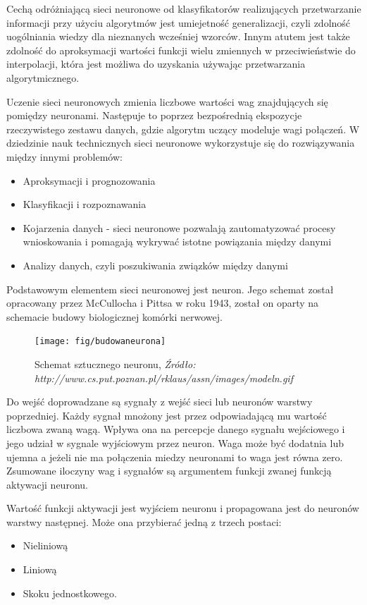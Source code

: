 \documentclass[brudnopis]{xmgr}
\begin{document}
Cechą odróżniającą sieci neuronowe od klasyfikatorów realizujących przetwarzanie informacji przy użyciu algorytmów jest umiejetność generalizacji, czyli zdolność uogólniania wiedzy dla nieznanych wcześniej wzorców. Innym atutem jest także zdolność do aproksymacji wartości funkcji wielu zmiennych w przeciwieństwie do interpolacji, która jest możliwa do uzyskania używając przetwarzania algorytmicznego.

Uczenie sieci neuronowych zmienia liczbowe wartości wag znajdujących się pomiędzy neuronami. Następuje to poprzez bezpośrednią ekspozycje rzeczywistego zestawu danych, gdzie algorytm uczący modeluje wagi połączeń. W dziedzinie nauk technicznych sieci neuronowe wykorzystuje się do rozwiązywania między innymi problemów:

\begin{itemize}
\item
Aproksymacji i prognozowania
\item
Klasyfikacji i rozpoznawania
\item
Kojarzenia danych - sieci neuronowe pozwalają zautomatyzować procesy wnioskowania i pomagają wykrywać istotne powiązania między danymi
\item
Analizy danych, czyli poszukiwania związków między danymi
\end{itemize}

Podstawowym elementem sieci neuronowej jest neuron. Jego schemat został opracowany przez McCullocha i Pittsa w roku 1943, został on oparty na schemacie budowy biologicznej komórki nerwowej.

\begin{figure}[!tbh]
\centering
\texttt{[image: fig/budowaneurona]}
\caption{Schemat sztucznego neuronu, \emph{Źródło: http://www.cs.put.poznan.pl/rklaus/assn/images/modeln.gif}}
\end{figure}

Do wejść doprowadzane są sygnały z wejść sieci lub neuronów warstwy poprzedniej. Każdy sygnał mnożony jest przez odpowiadającą mu wartość liczbowa zwaną wagą. Wpływa ona na percepcje danego sygnału wejściowego i jego udział w sygnale wyjściowym przez neuron. Waga może być dodatnia lub ujemna a jeżeli nie ma połączenia miedzy neuronami to waga jest równa zero. Zsumowane iloczyny wag i sygnałów są argumentem funkcji zwanej funkcją aktywacji neuronu.
\newpage

Wartość funkcji aktywacji jest wyjściem neuronu i propagowana jest do neuronów warstwy następnej. Może ona przybierać jedną z trzech postaci:
\begin{itemize}
\item
Nieliniową
\item
Liniową
\item
Skoku jednostkowego.
\end{itemize}
\end{document}

